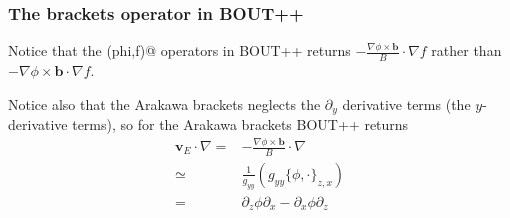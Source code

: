\documentclass[12pt]{article}
\def\L{\left}
\def\R{\right}
\newcommand{\ve}[1]{\ensuremath{\boldsymbol{#1}}}
\begin{document}
\subsubsection{The brackets operator in BOUT++}
%
Notice that the \verb@brackets(phi,f)@ operators in BOUT++ returns
$-\frac{\nabla\phi\times\ve{b}}{B}\cdot\nabla f$ rather than
$-\nabla\phi\times\ve{b}\cdot\nabla f$.

Notice also that the Arakawa brackets neglects the $\partial_y$ derivative
terms (the $y$-derivative terms), so for the Arakawa brackets BOUT++ returns
%
\begin{align*}
    \ve{v}_E\cdot\nabla
    =& -\frac{\nabla\phi\times\ve{b}}{B}\cdot\nabla\\
    \simeq& \frac{1}{g_{yy}}
	       \L(
                 g_{yy}\{\phi, \cdot\}_{z,x}
	       \R)\\
    =& \partial_z\phi\partial_x - \partial_x\phi\partial_z
\end{align*}
%
\end{document}
